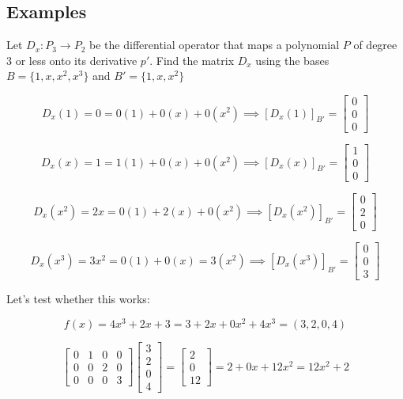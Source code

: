 \documentclass{report}
\begin{document}
\subsection{Examples}

\begin{tcolorbox}[colframe = lightred]
	Let $D_x: P_3 \to P_2$ be the differential operator that maps a polynomial $P$ of degree 3 or less onto its derivative $p'$. Find the matrix $D_x$ using the bases $B = \{ 1,x,x^2,x^3\}$ and $B' = \{1,x,x^2\}$
\end{tcolorbox}

$$
D_x (1) = 0 = 0(1) + 0(x) + 0(x^2) \implies [D_x (1)]_{B'} = \begin{bmatrix} 0 \\ 0 \\ 0 \end{bmatrix}
$$

$$
D_x (x) = 1 = 1(1) + 0(x) + 0(x^2) \implies [D_x (x)]_{B'}	= \begin{bmatrix} 1 \\ 0 \\ 0 \end{bmatrix} 
$$
	
$$
D_x (x^2) = 2x = 0(1) + 2(x) + 0(x^2) \implies [D_x (x^2)]_{B'} = \begin{bmatrix} 0 \\ 2 \\ 0 \end{bmatrix} 
$$

$$
D_x(x^3) = 3x^2 = 0(1) + 0(x) = 3(x^2) \implies [D_x (x^3)]_{B'} = \begin{bmatrix} 0 \\ 0 \\ 3 \end{bmatrix}
$$

\noindent Let's test whether this works:

$$
f(x) = 4x^3 + 2x + 3  = 3 + 2x  + 0x^2 + 4x^3 = (3,2,0,4)
$$

$$
\begin{bmatrix} 0 & 1 & 0 & 0 \\ 0 & 0 & 2 & 0 \\ 0	& 0 & 0 & 3 \end{bmatrix} \begin{bmatrix} 3 \\2 \\ 0 \\ 4 \end{bmatrix} = \begin{bmatrix}2 \\ 0 \\ 12 \end{bmatrix} = 2 + 0x +12 x^2 = \boxed{12x^2 + 2}
$$
\end{document}
